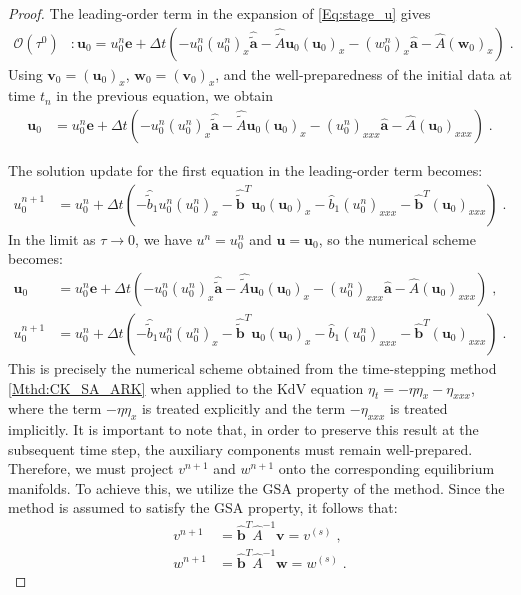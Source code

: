 \documentclass{article}
\newcommand{\ukdv}{\eta}
\newcommand{\tIIAex}{\hat{\tilde{A}}}
\newcommand{\tIIaex}{\pmb{\hat{\tilde{a}}}}
\newcommand{\tIIbexf}{\hat{\tilde{b}}_1}
\newcommand{\tIIbex}{\pmb{\hat{\tilde{b}}}}
\newcommand{\tIIAim}{\hat{A}}
\newcommand{\tIIaim}{\pmb{\hat{a}}}
\newcommand{\tIIbim}{\pmb{\hat{b}}}
\newcommand{\tIIbimf}{\hat{b}_1}
\begin{document}
\begin{proof}
The leading-order term in the expansion of \eqref{Eq:stage_u} gives
\begin{align*}
    \mathcal{O}\left(\tau^{0}\right) & \colon \pmb{u}_0 = u_0^n \pmb{e} + \Delta t \left( - u_0^n (u_{0}^n)_x \tIIaex - \tIIAex \pmb{u}_0 (\pmb{u}_0)_x -(w_0^n)_x \tIIaim - \tIIAim(\pmb{w}_0)_x \right)\;.
\end{align*}
Using $\pmb{v}_0 =  (\pmb{u}_0)_x$, $\pmb{w}_0 =  (\pmb{v}_0)_x$, and the well-preparedness of the initial data at time $t_n$
in the previous equation, we obtain
\begin{align}\label{Eq:Asymp_stage_u}
    \pmb{u}_0 & = u_0^n \pmb{e} + \Delta t \left(  - u_0^n (u_{0}^n)_x \tIIaex - \tIIAex \pmb{u}_0 (\pmb{u}_0)_x -(u_0^n)_{xxx} \tIIaim - \tIIAim(\pmb{u}_0)_{xxx}  \right)\;.
\end{align}

The solution update for the first equation in the leading-order term becomes:
\begin{align}\label{Eq:Asymp_sol_u}
    u_0^{n+1} &= u_0^n  + \Delta t \left(  - \tIIbexf u_0^n (u_{0}^n)_x  - \tIIbex^T  \pmb{u}_0 (\pmb{u}_0)_x -\tIIbimf(u_0^n)_{xxx}  - \tIIbim^T  (\pmb{u}_0)_{xxx} \right) \;.
\end{align}
In the limit as $\tau \to 0$, we have $u^n = u^n_0$ and $\pmb{u} = \pmb{u}_0$, so the numerical scheme becomes:
\begin{subequations}
    \begin{align*}
        \pmb{u}_0 & = u_0^n \pmb{e} + \Delta t \left(  - u_0^n (u_{0}^n)_x \tIIaex - \tIIAex \pmb{u}_0 (\pmb{u}_0)_x -(u_0^n)_{xxx} \tIIaim - \tIIAim(\pmb{u}_0)_{xxx}  \right)\;, \\
        u_0^{n+1} &= u_0^n  + \Delta t \left(  - \tIIbexf u_0^n (u_{0}^n)_x  - \tIIbex^T  \pmb{u}_0 (\pmb{u}_0)_x -\tIIbimf(u_0^n)_{xxx}  - \tIIbim^T  (\pmb{u}_0)_{xxx} \right)\;.
    \end{align*}
\end{subequations}
This is precisely the numerical scheme obtained from the time-stepping method \eqref{Mthd:CK_SA_ARK} when applied to the KdV
equation $\ukdv_t = - \ukdv \ukdv_x -\ukdv_{xxx} $, where the term $-\ukdv \ukdv_x$ is treated explicitly and the term $-\ukdv_{xxx}$ is treated implicitly.
It is important to note that, in order to preserve this result at the subsequent time step, the auxiliary components must
remain well-prepared. Therefore, we must project $v^{n+1}$ and $w^{n+1}$ onto the corresponding equilibrium manifolds. To achieve
this, we utilize the GSA property of the method. Since the method is assumed to satisfy the GSA property, it follows that:
\begin{subequations}
\begin{align*}
    v^{n+1} &= \tIIbim^T\tIIAim^{-1}\pmb{v} = v^{(s)} \;, \\
    w^{n+1} &= \tIIbim^T\tIIAim^{-1}\pmb{w} = w^{(s)} \;.
\end{align*}
\end{subequations}


\end{proof}
\end{document}

